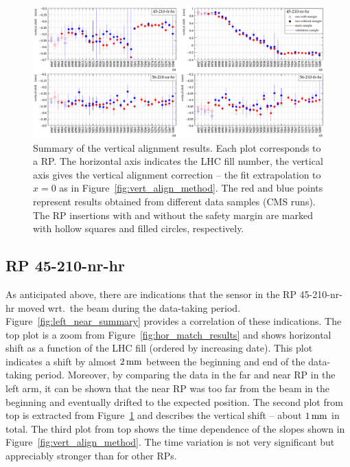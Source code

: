 \documentclass[TOTEM]{cern/cernphprep}
\def\un#1{\,{\rm #1}}
\begin{document}
\begin{figure}[h!]
\begin{center}
\includegraphics[width=\hsize]{fig/physics_fills/final_alignment_y_cmp_ph_sample.pdf}
\caption{%
Summary of the vertical alignment results. Each plot corresponds to a RP. The horizontal axis indicates the LHC fill number, the vertical axis gives the vertical alignment correction -- the fit extrapolation to $x=0$ as in Figure~\ref{fig:vert_align_method}. The red and blue points represent results obtained from different data samples (CMS runs). The RP insertions with and without the safety margin are marked with hollow squares and filled circles, respectively.
}
\label{fig:vert_align_results}
\end{center}
\end{figure}



\subsection{RP 45-210-nr-hr}
\label{s:phys-left-near}

As anticipated above, there are indications that the sensor in the RP 45-210-nr-hr moved wrt.~the beam during the data-taking period. Figure~\ref{fig:left_near_summary} provides a correlation of these indications. The top plot is a zoom from Figure~\ref{fig:hor_match_results} and shows horizontal shift as a function of the LHC fill (ordered by increasing date). This plot indicates a shift by almost $2\un{mm}$ between the beginning and end of the data-taking period. Moreover, by comparing the data in the far and near RP in the left arm, it can be shown that the near RP was too far from the beam in the beginning and eventually drifted to the expected position. The second plot from top is extracted from Figure~\ref{fig:vert_align_results} and describes the vertical shift -- about $1\un{mm}$ in total. The third plot from top shows the time dependence of the slopes shown in Figure~\ref{fig:vert_align_method}. The time variation is not very significant but appreciably stronger than for other RPs.
\end{document}
